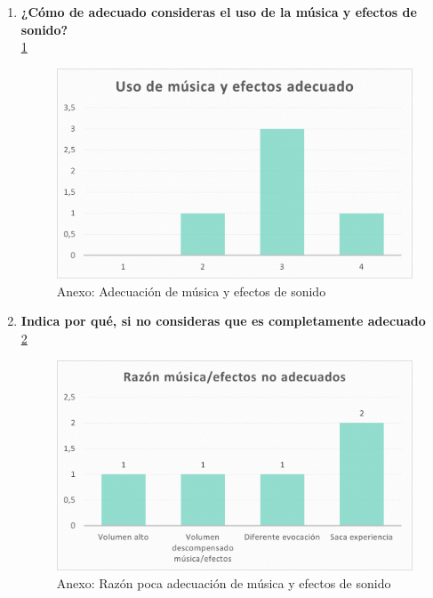 \documentclass[12pt, a4paper,twoside,titlepage]{book}
\begin{document}
\begin{enumerate}[label=\textbf{\arabic*}.]
	 \item \textbf{¿Cómo de adecuado consideras el uso de la música y efectos de sonido?}\\
	 \ref{fig:anexMusic}
	 	 \begin{figure}
	 	\centering
	 	\includegraphics[width=.8\linewidth]{Anexo Demo/3AnexDem_musi}
	 	\caption{Anexo: Adecuación de música y efectos de sonido}
	 	\label{fig:anexMusic}
	 	\end{figure}
	 \item \textbf{ Indica por qué, si no consideras que es completamente adecuado}\\
	 	\ref{fig:anexRazonmusic}
	 	 \begin{figure}
	 	\centering
	 	\includegraphics[width=.8\linewidth]{Anexo Demo/4AnexDemo_razonmusi}
	 	\caption{Anexo: Razón poca adecuación de música y efectos de sonido}
	 	\label{fig:anexRazonmusic}
	 \end{figure}
	 

\end{enumerate}
\end{document}
